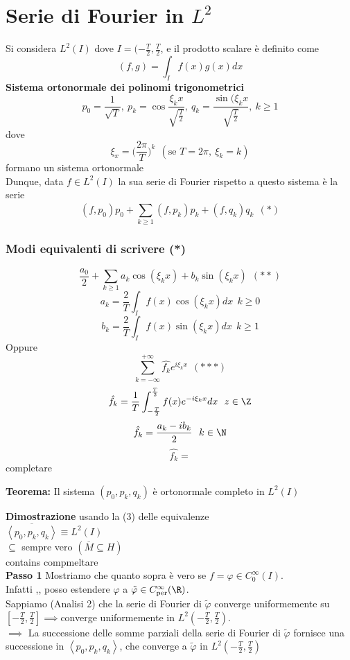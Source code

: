 

\section{Serie di Fourier in $L^2$}
Si considera $L^{2}(I)$ dove $I=(-\frac{T}{2},\frac{T}{2}$, e il prodotto scalare è definito come
\[(f,g)=\int_{I}^{} f(x)g(x)dx\]
\textbf{Sistema ortonormale dei polinomi trigonometrici}
\[p_0=\frac{1}{\sqrt{T} },\ p_k=\cos\frac{\xi_kx}{\sqrt{\frac{T}{2}} },\ q_k= \frac{\sin(\xi_kx}{\sqrt{\frac{T}{2}} },\ k\ge 1\]
dove 
\[\xi_x=\bigg(\frac{2\pi}{T}\bigg)^k\ \ (\text{se }T=2\pi,\ \xi_k=k)\]
formano un sistema ortonormale
\\Dunque, data $f\in L^{2}(I)$ la sua serie di Fourier rispetto a questo sistema è la serie
\[(f,p_0)p_0+\sum_{k\ge 1}^{} (f,p_k)p_k+(f,q_k)q_k\ \ (*)\]
\subsubsection{Modi equivalenti di scrivere (*)}
\[\frac{a_0}{2}+\sum_{k\ge 1}^{} a_k\cos(\xi_kx)+b_k\sin(\xi_kx)\ \ (* *)\]
\[a_k=\frac{2}{T}\int_{I}^{} f(x)\cos(\xi_kx)dx\ \ k\ge 0\]
\[b_k=\frac{2}{T}\int_{I}^{} f(x)\sin(\xi_kx)dx\ \ k\ge 1\]
Oppure 
\[\sum_{k=-\infty}^{+\infty} \hat{f_k}e^{i\xi_kx}\ \ (* * *)\]
\[\hat{f_k}=\frac{1}{T}\int_{-\frac{T}{2}}^{\frac{T}{2}} f(x)e^{-i\xi_kx}dx\ \ z\in \Z\]
\[\hat{f_k}= \frac{a_k-ib_k}{2}\ \ k\in \N\]
\[\hat{f_k}= \]
completare
\begin{tcolorbox}
	\textbf{Teorema: }Il sistema $(p_0,p_k,q_k)$ è ortonormale completo in $L^{2}(I)$
\end{tcolorbox}
\textbf{Dimostrazione} usando la (3) delle equivalenze
\\$\overline{\left< p_0,p_k,q_k \right> }\equiv L^{2}(I)$ 
\\$\subseteq  $ sempre vero $(\overline{M}\subseteq  H)$ 
\\contains compmeltare
\\\textbf{Passo 1} Mostriamo che quanto sopra è vero se $f=\varphi\in C_0^\infty(I)$.
\\Infatti ,, posso estendere $\varphi$ a $\tilde\varphi\in C_{\text{per}}^\infty(\R)$.
\\Sappiamo (Analisi 2) che la serie di Fourier di $\tilde\varphi$ converge uniformemente su $[-\frac{T}{2},\frac{T}{2}]\implies $converge uniformemente in $L^{2}(-\frac{T}{2},\frac{T}{2})$.
\\$\implies $ La successione delle somme parziali della serie di Fourier di $\tilde\varphi$ fornisce una successione in $\left< p_0,p_k,q_k \right> $, che converge a $\tilde\varphi$ in $L^{2}(-\frac{T}{2},\frac{T}{2})$
